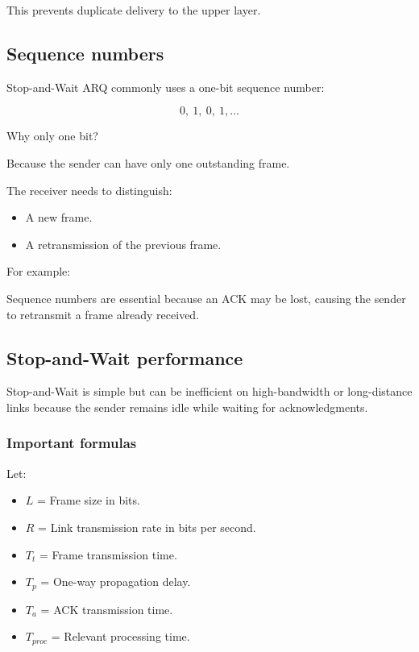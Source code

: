 This prevents duplicate delivery to the upper layer.

\subsection{Sequence numbers}

Stop-and-Wait ARQ commonly uses a one-bit sequence number:



\[
\boxed{0,\ 1,\ 0,\ 1,\ldots}
\]



Why only one bit?

Because the sender can have only one outstanding frame.

The receiver needs to distinguish:

\begin{itemize}
\item A new frame.
\item A retransmission of the previous frame.
\end{itemize}

For example:


Sequence numbers are essential because an ACK may be lost, causing the sender to retransmit a frame already received.

\subsection{Stop-and-Wait performance}

Stop-and-Wait is simple but can be inefficient on high-bandwidth or long-distance links because the sender remains idle while waiting for acknowledgments.

\subsubsection{Important formulas}

Let:

\begin{itemize}
\item $L$ = Frame size in bits.
\item $R$ = Link transmission rate in bits per second.
\item $T_t$ = Frame transmission time.
\item $T_p$ = One-way propagation delay.
\item $T_a$ = ACK transmission time.
\item $T_{proc}$ = Relevant processing time.
\end{itemize}

